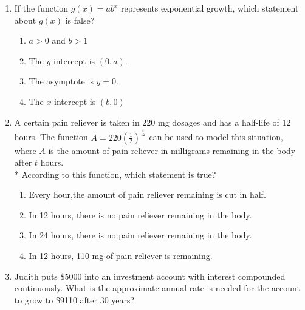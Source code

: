 \documentclass[12pt, oneside]{article}
\begin{document}
\begin{enumerate}
\newpage
\item If the function $g(x) = ab^x$ represents exponential growth, which statement about $g(x)$ is false?
\begin{enumerate}
    \item $a > 0$ and $b>1$
    \item The $y$-intercept is $(0, a)$.
    \item The asymptote is $y=0$.
    \item The $x$-intercept is $(b,0)$
\end{enumerate} %

\item A certain pain reliever is taken in 220 mg dosages and has a half-life of 12 hours. The function $\displaystyle A = 220 \left( \frac{1}{2} \right) ^\frac{t}{12}$ can be used to model this situation, where $A$ is the amount of pain reliever in milligrams remaining in the body after $t$ hours.\\*
According to this function, which statement is true?
\begin{enumerate}
    \item Every hour,the amount of pain reliever remaining is cut in half. 
    \item In 12 hours, there is no pain reliever remaining in the body.
    \item In 24 hours, there is no pain reliever remaining in the body.
    \item In 12 hours, 110 mg of pain reliever is remaining.
\end{enumerate}

\item Judith puts \$5000 into an investment account with interest compounded continuously. What is the approximate annual rate is needed for the account to grow to \$9110 after 30 years?

\end{enumerate}
\end{document}
